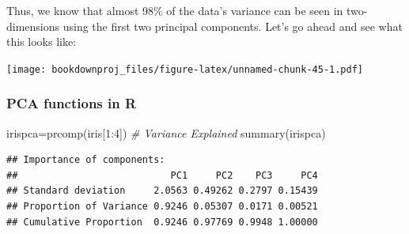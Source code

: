 \documentclass[
]{article}
\newenvironment{Shaded}{\begin{snugshade}}{\end{snugshade}}
\newcommand{\AttributeTok}[1]{\textcolor[rgb]{0.77,0.63,0.00}{#1}}
\newcommand{\CommentTok}[1]{\textcolor[rgb]{0.56,0.35,0.01}{\textit{#1}}}
\newcommand{\DecValTok}[1]{\textcolor[rgb]{0.00,0.00,0.81}{#1}}
\newcommand{\FunctionTok}[1]{\textcolor[rgb]{0.00,0.00,0.00}{#1}}
\newcommand{\NormalTok}[1]{#1}
\newcommand{\OtherTok}[1]{\textcolor[rgb]{0.56,0.35,0.01}{#1}}
\newcommand{\SpecialCharTok}[1]{\textcolor[rgb]{0.00,0.00,0.00}{#1}}
\newcommand{\StringTok}[1]{\textcolor[rgb]{0.31,0.60,0.02}{#1}}
\theoremstyle{definition}
\theoremstyle{definition}
\theoremstyle{definition}
\theoremstyle{definition}
\theoremstyle{remark}
\begin{document}
Thus, we know that almost 98\% of the data's variance can be seen in two-dimensions using the first two principal components. Let's go ahead and see what this looks like:

\begin{Shaded}
\end{Shaded}

\texttt{[image: bookdownproj\_files/figure-latex/unnamed-chunk-45-1.pdf]}

\hypertarget{pca-functions-in-r}{%
\subsubsection{PCA functions in R}\label{pca-functions-in-r}}

\begin{Shaded}
\begin{Highlighting}[]
\NormalTok{irispca}\OtherTok{=}\FunctionTok{prcomp}\NormalTok{(iris[}\DecValTok{1}\SpecialCharTok{:}\DecValTok{4}\NormalTok{])}
\CommentTok{\# Variance Explained}
\FunctionTok{summary}\NormalTok{(irispca)}
\end{Highlighting}
\end{Shaded}

\begin{verbatim}
## Importance of components:
##                           PC1     PC2    PC3     PC4
## Standard deviation     2.0563 0.49262 0.2797 0.15439
## Proportion of Variance 0.9246 0.05307 0.0171 0.00521
## Cumulative Proportion  0.9246 0.97769 0.9948 1.00000
\end{verbatim}

\begin{Shaded}
\end{Shaded}
\end{document}
